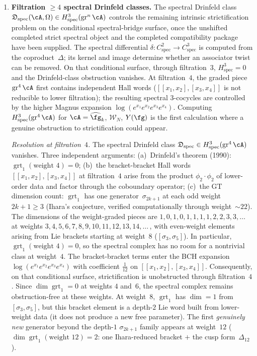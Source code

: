 \begin{enumerate}
\item \textbf{Filtration $\geq 4$ spectral Drinfeld classes.}
 The spectral Drinfeld class
 $\mathfrak{D}_{\mathrm{spec}}(\cA, \Omega) \in
 H^3_{\mathrm{spec}}(\operatorname{gr}^n \cA)$
 controls the remaining intrinsic strictification problem on the
 conditional spectral-bridge surface, once the unshifted completed
 strict spectral object and the completed compatibility package have
 been supplied.
 The spectral differential
 $\delta \colon C^2_{\mathrm{spec}} \to C^3_{\mathrm{spec}}$
 is computed from the coproduct~$\Delta$; its kernel and
 image determine whether an associator twist can be removed.
 On that conditional surface, through filtration~$3$,
 $H^3_{\mathrm{spec}} = 0$ and the Drinfeld-class obstruction
 vanishes.
 At filtration~$4$, the graded piece $\operatorname{gr}^4 \cA$
 first contains independent Hall words
 ($[[x_1, x_2], [x_3, x_4]]$ is not reducible to lower
 filtration); the resulting spectral $3$-cocycles are
 controlled by the higher Magnus expansion
 $\log(e^{x_1} e^{x_2} e^{x_3} e^{x_4})$.
 Computing $H^3_{\mathrm{spec}}(\operatorname{gr}^4 \cA)$
 for $\cA = \widehat{\fg}_k$, $\mathcal{W}_N$, $Y(\fg)$
 is the first calculation where a genuine obstruction to
 strictification could appear.

 \emph{Resolution at filtration~$4$.}
 The spectral Drinfeld class
 $\mathfrak{D}_{\mathrm{spec}} \in
 H^3_{\mathrm{spec}}(\operatorname{gr}^4 \cA)$ vanishes.
 Three independent arguments:
 \textup{(a)}~Drinfeld's theorem \textup{(}1990\textup{)}:
 $\operatorname{grt}_1(\text{weight }4) = 0$;
 \textup{(b)}~the bracket-bracket Hall words
 $[[x_1,x_2],[x_3,x_4]]$ at filtration~$4$ arise from the
 product $\phi_2 \cdot \phi_2$ of lower-order data and
 factor through the coboundary operator;
 \textup{(c)}~the GT dimension count:
 $\operatorname{grt}_1$ has one generator~$\sigma_{2k+1}$
 at each odd weight $2k+1 \geq 3$
 \textup{(}Ihara's conjecture, verified computationally through
 weight~$\sim 22$\textup{)}.
 The dimensions of the weight-graded pieces are
 $1, 0, 1, 0, 1, 1, 1, 1, 2, 2, 3, 3, \dotsc$ at weights
 $3, 4, 5, 6, 7, 8, 9, 10, 11, 12, 13, 14, \dotsc$\,,
 with even-weight elements arising from Lie brackets
 starting at weight~$8$ \textup{(}$[\sigma_3, \sigma_5]$\textup{)}.
 In particular, $\operatorname{grt}_1(\text{weight }4) = 0$,
 so the spectral complex has no room for a nontrivial class
 at weight~$4$. The bracket-bracket terms enter the BCH expansion
 $\log(e^{x_1} e^{x_2} e^{x_3} e^{x_4})$ with
 coefficient $\tfrac{1}{12}$ on $[[x_1,x_2],[x_3,x_4]]$.
 Consequently, on that conditional surface, strictification is
 unobstructed through filtration~$4$. Since
 $\dim\operatorname{grt}_1 = 0$ at weights
 $4$ and~$6$, the spectral complex remains
 obstruction-free at these weights. At weight~$8$,
 $\operatorname{grt}_1$ has $\dim = 1$ from
 $[\sigma_3, \sigma_5]$, but this bracket element is a
 depth-$2$ Lie word built from lower-weight data (it does
 not produce a new free parameter). The first
 \emph{genuinely new} generator beyond the depth-$1$
 $\sigma_{2k+1}$ family appears at weight~$12$
 ($\dim\operatorname{grt}_1(\text{weight }12) = 2$:
 one Ihara-reduced bracket $+$ the cusp
 form~$\Delta_{12}$).
\end{enumerate}

